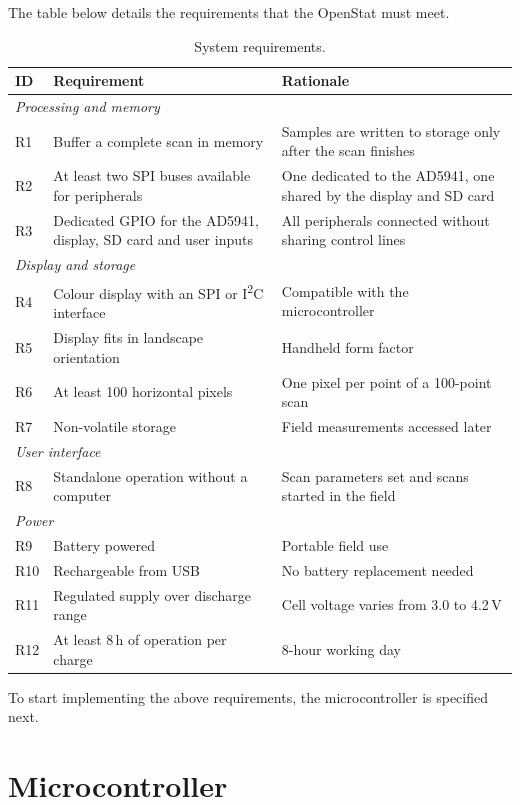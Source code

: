 The table below details the requirements that the OpenStat must meet.
\begin{table}[h]
\centering
\caption{System requirements.}
\label{tab:requirements_whole_sys}
\begin{tabularx}{\textwidth}{l X X}
\toprule
ID & Requirement & Rationale \\
\midrule
\multicolumn{3}{l}{\textit{Processing and memory}} \\
R1 & Buffer a complete scan in memory & Samples are written to storage only after the scan finishes \\
R2 & At least two SPI buses available for peripherals & One dedicated to the AD5941, one shared by the display and SD card \\
R3 & Dedicated GPIO for the AD5941, display, SD card and user inputs & All peripherals connected without sharing control lines \\
\midrule
\multicolumn{3}{l}{\textit{Display and storage}} \\
R4 & Colour display with an SPI or I\textsuperscript{2}C interface & Compatible with the microcontroller \\
R5 & Display fits in landscape orientation & Handheld form factor \\
R6 & At least 100 horizontal pixels & One pixel per point of a 100-point scan \\
R7 & Non-volatile storage & Field measurements accessed later \\
\midrule
\multicolumn{3}{l}{\textit{User interface}} \\
R8 & Standalone operation without a computer & Scan parameters set and scans started in the field \\
\midrule
\multicolumn{3}{l}{\textit{Power}} \\
R9 & Battery powered & Portable field use \\
R10 & Rechargeable from USB & No battery replacement needed \\
R11 & Regulated supply over discharge range & Cell voltage varies from 3.0 to 4.2\,V \\
R12 & At least 8\,h of operation per charge & 8-hour working day \\
\bottomrule
\end{tabularx}
\end{table}

To start implementing the above requirements, the microcontroller is specified next.

\section{Microcontroller}
\label{sec:hw_mcu}


